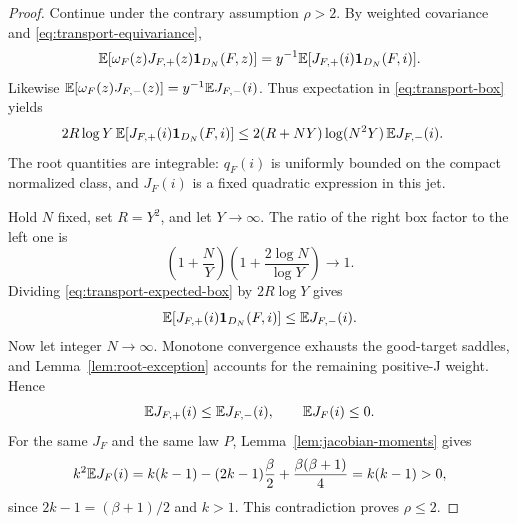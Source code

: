 \begin{proof}
 Continue under the contrary assumption $\rho>2$.  By weighted
 covariance and \eqref{eq:transport-equivariance},
 \[
 \mathbb E[\omega_F(z)J_{F,+}(z)\mathbf 1_{D_N}(F,z)]
  =y^{-1}\mathbb E[J_{F,+}(i)\mathbf 1_{D_N}(F,i)].
 \]
 Likewise $\mathbb E[\omega_F(z)J_{F,-}(z)]=y^{-1}\mathbb E J_{F,-}(i)$.
 Thus expectation in \eqref{eq:transport-box} yields
 \begin{equation}\label{eq:transport-expected-box}
 \begin{split}
 2R\log Y\,
   \mathbb E[J_{F,+}(i)\mathbf 1_{D_N}(F,i)]
 \leq{}&
 2(R+NY)\log(N^2Y)\,\mathbb E J_{F,-}(i).
 \end{split}
 \end{equation}
 The root quantities are integrable: $q_F(i)$ is uniformly bounded
 on the compact normalized class, and $J_F(i)$ is a fixed quadratic
 expression in this jet.

 Hold $N$ fixed, set $R=Y^2$, and let $Y\to\infty$.  The ratio of the
 right box factor to the left one is
 \[
  \left(1+\frac NY\right)
  \left(1+\frac{2\log N}{\log Y}\right)\longrightarrow1.
 \]
 Dividing \eqref{eq:transport-expected-box} by $2R\log Y$ gives
 \[
  \mathbb E[J_{F,+}(i)\mathbf 1_{D_N}(F,i)]\leq\mathbb E J_{F,-}(i).
 \]
 Now let integer $N\to\infty$.  Monotone convergence exhausts the
 good-target saddles, and Lemma~\ref{lem:root-exception} accounts for
 the remaining positive-J weight.  Hence
 \[
  \mathbb E J_{F,+}(i)\leq\mathbb E J_{F,-}(i),\qquad \mathbb E J_F(i)\leq0.
 \]
 For the same $J_F$ and the same law $P$,
 Lemma~\ref{lem:jacobian-moments} gives
 \[
  k^2\mathbb E J_F(i)
  =k(k-1)-(2k-1)\frac{\beta}{2}
                   +\frac{\beta(\beta+1)}4
  =k(k-1)>0,
 \]
 since $2k-1=(\beta+1)/2$ and $k>1$.  This contradiction proves
 $\rho\leq2$.
\end{proof}
